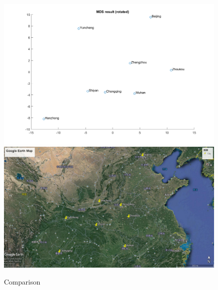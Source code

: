 \documentclass{article}
\begin{document}
{{        \begin{figure}[H]
            \centering
            \includegraphics[width = 1\linewidth]{Q1/rotated.png}
            \includegraphics[width = 1\linewidth]{Q1/map.jpg}
            \caption{Comparison}
        \end{figure}
    }
}
\end{document}
